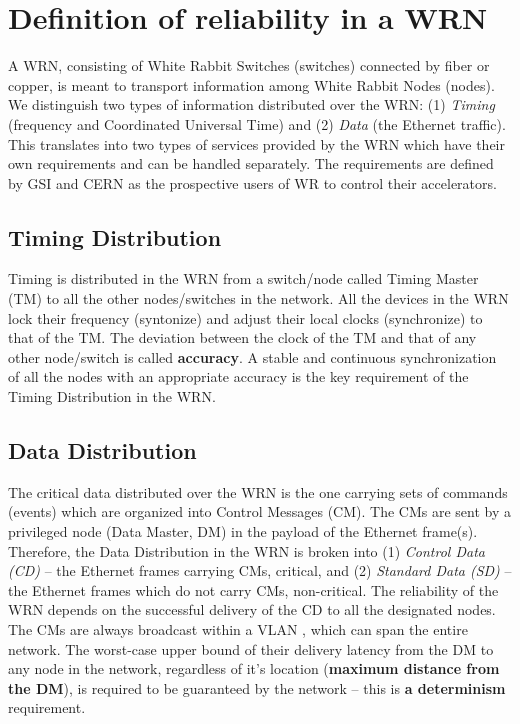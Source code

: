 \section{Definition of reliability in a WRN}

A WRN, consisting of White Rabbit Switches (switches) connected by fiber 
or copper, is meant to transport information among White Rabbit Nodes (nodes). We distinguish 
two types of information distributed over the WRN: 
(1) {\it Timing} (frequency and Coordinated Universal Time) and 
(2) {\it Data} (the Ethernet traffic).
This translates into two types of services provided by the WRN which have their own requirements and
can be handled separately. The requirements are defined by GSI and CERN as the prospective 
users of WR to control their accelerators.


\subsection{Timing Distribution}

Timing is distributed in the WRN from a switch/node called Timing Master (TM) 
to all the other nodes/switches in the network. 
All the devices in the 
WRN lock their frequency (syntonize) and adjust their local clocks (synchronize) to that of the TM. 
The deviation between the clock of the TM and that of any other node/switch is called {\bf accuracy}. 
A stable and continuous synchronization of all the nodes with an appropriate accuracy is the key 
requirement of the Timing Distribution in the WRN.

\subsection{Data Distribution}

The critical data distributed over the WRN is the one carrying sets of commands (events) which are 
organized into Control Messages (CM). The CMs are sent by a privileged node (Data Master, DM) in the 
payload of the Ethernet frame(s). Therefore, the Data Distribution in the WRN is broken into 
(1) {\it Control Data (CD)}  -- the Ethernet frames carrying CMs, critical, and 
(2) {\it Standard Data (SD)} -- the Ethernet frames which do not carry CMs, non-critical.
The reliability of the WRN depends on the successful delivery of the CD to all 
the designated nodes. The CMs are always broadcast within a VLAN
, which can span 
the entire network. The worst-case upper bound of their delivery latency from the DM to any node in 
the network, regardless of it's location ({\bf maximum distance from the DM}), is required to be 
guaranteed by the network -- this is {\bf a determinism} requirement. 

